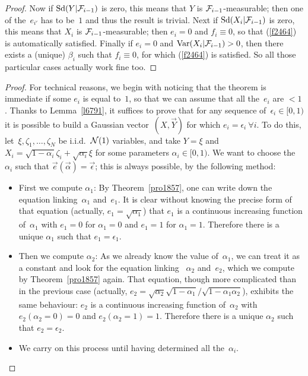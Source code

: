 \begin{proof}
Now if $\operatorname{Sd}(Y|\mathcal{F}_{i-1})$ is zero, this means that $Y$ is $\mathcal{F}_{i-1}$-measurable;
then one of the~$e_{i'}$ has to be~$1$ and thus the result is trivial.
Next if $\operatorname{Sd}(X_i|\mathcal{F}_{i-1})$ is zero,
this means that $X_i$ is $\mathcal{F}_{i-1}$-measurable;
then $e_i = 0$ and $f_i \equiv 0$, so that (\ref{f2464}) is automatically satisfied.
Finally if $e_i = 0$ and $\operatorname{Var}(X_i|\mathcal{F}_{i-1})>0$, then there exists a (unique) $\beta_i$
such that $f_i \equiv 0$, for which (\ref{f2464}) is satisfied.
So all those particular cases actually work fine too.
\end{proof}\endgroup

\begingroup{}\begin{proof}
For technical reasons, we begin with noticing that the theorem
is immediate if some $e_i$ is equal to~$1$,
so that we can assume that all the~$e_i$ are $<1$.
Thanks to Lemma~\ref{l6791}, it suffices to prove that
for any sequence of~$\epsilon_i \in [0,1)$
it is possible to build a Gaussian vector~$(X,\vec{Y})$
for which $e_i = \epsilon_i \ \forall i$.
To do this, let~$\xi, \zeta_1, \ldots, \zeta_N$ be i.i.d.\ $\mathcal{N}(1)$ variables,
and take $Y = \xi$ and $X_i = \sqrt{1-\alpha_i}\zeta_i + \sqrt{\alpha_i}\xi$
for some parameters $\alpha_i \in [0,1)$.
We want to choose the~$\alpha_i$ such that $\vec{e}(\vec{\alpha}) = \vec{\epsilon}$;
this is always possible, by the following method:
\begin{itemize}
\item First we compute $\alpha_1$: By Theorem~\ref{pro1857},
one can write down the equation linking~$\alpha_1$ and~$e_1$.
It is clear without knowing the precise form of that equation
(actually, $e_1 = \sqrt{\alpha_1}$)
that $e_1$ is a continuous increasing function of~$\alpha_1$
with $e_1=0$ for $\alpha_1=0$ and $e_1=1$ for $\alpha_1=1$.
Therefore there is a unique $\alpha_1$ such that $e_1=\epsilon_1$.
\item Then we compute $\alpha_2$: As we already know the value of~$\alpha_1$,
we can treat it as a constant and look for the equation linking~%
$\alpha_2$ and~$e_2$, which we compute by Theorem~\ref{pro1857} again.
That equation, though more complicated than in the previous case
(actually, $e_2 = \sqrt{\alpha_2}\sqrt{1-\alpha_1}/\sqrt{1-\alpha_1\alpha_2}$),
exhibits the same behaviour: $e_2$ is a continuous increasing function of~$\alpha_2$
with $e_2(\alpha_2=0)=0$ and $e_2(\alpha_2=1)=1$.
Therefore there is a unique $\alpha_2$ such that $e_2=\epsilon_2$.
\item We carry on this process until having determined all the~$\alpha_i$.
\end{itemize}
\end{proof}\endgroup


